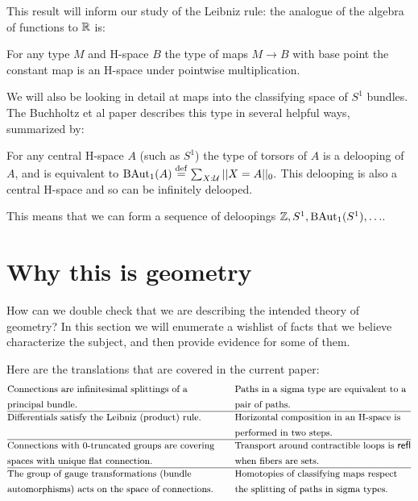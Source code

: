 This result will inform our study of the Leibniz rule: the analogue of
the algebra of functions to \(\mathbb{R}\) is:

\begin{myprop}
For any type \( M \) and H-space \( B \) the type of maps \( M\to B \) with base point the constant map is an H-space under pointwise multiplication.
\end{myprop}

We will also be looking in detail at maps into the classifying space of
\(S^1\) bundles. The Buchholtz et al paper\cite{buchholtz2023central}
describes this type in several helpful ways, summarized by:

\begin{mythm}
For any central H-space \( A \) (such as \( S^1 \)) the type of torsors of \( A \) is a delooping of \( A \), and is equivalent to \( \mathrm{BAut}_1(A)\stackrel{\mathrm{def}}{=} \sum_{X:\mathcal{U}}||X=A||_0. \) This delooping is also a central H-space and so can be infinitely delooped.
\end{mythm}

This means that we can form a sequence of deloopings
\(\mathbb{Z}, S^1, \mathrm{BAut}_1(S^1), \ldots\).

\section{Why this is geometry}\label{why-this-is-geometry}

How can we double check that we are describing the intended theory of
geometry? In this section we will enumerate a wishlist of facts that we
believe characterize the subject, and then provide evidence for some of
them.

Here are the translations that are covered in the current paper:
\[\begin{aligned}
& \text{\small Connections are infinitesimal splittings of a} & \quad &\text{\small Paths in a sigma type are equivalent to a}        \\
& \text{\small principal bundle.} & \quad&\text{\small pair of paths.}        \\ \hline
& \text{\small Differentials satisfy the Leibniz (product) rule.} &\quad  &\text{\small Horizontal composition in an H-space is} \\ 
&  &  \quad&\text{\small performed in two steps.} \\ \hline
& \text{\small Connections with 0-truncated groups are covering}        &\quad &\text{\small Transport around contractible loops is } \mathsf{refl}             \\ 
& \text{\small spaces with unique flat connection.}        & \quad&\text{\small when fibers are sets.}             \\ \hline
& \text{\small The group of gauge transformations (bundle} &\quad &\text{\small Homotopies of classifying maps respect } \\ 
& \text{\small automorphisms) acts on the space of connections.} & \quad&\text{\small the splitting of paths in sigma types.} \\ 
\end{aligned}\]

